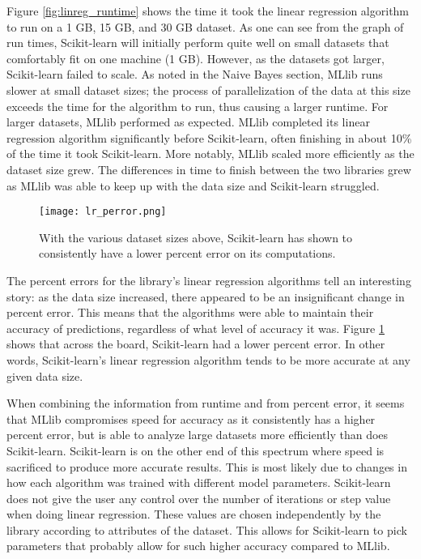 \documentclass[9pt,twocolumn,twoside]{idsi}
\begin{document}
Figure \ref{fig:linreg_runtime} shows the time it took the linear regression algorithm to run on a 1 GB, 15 GB, and 30 GB dataset. As one can see from the graph of run times, Scikit-learn will initially perform quite well on small datasets that comfortably fit on one machine (1 GB). However, as the datasets got larger, Scikit-learn failed to scale. As noted in the Naive Bayes section, MLlib runs slower at small dataset sizes; the process of parallelization of the data at this size exceeds the time for the algorithm to run, thus causing a larger runtime. For larger datasets, MLlib performed as expected. MLlib completed its linear regression algorithm significantly before Scikit-learn, often finishing in about 10\% of the time it took Scikit-learn. More notably, MLlib scaled more efficiently as the dataset size grew. The differences in time to finish between the two libraries grew as MLlib was able to keep up with the data size and Scikit-learn struggled. 


\begin{figure}[htbp]
\centering
\texttt{[image: lr\_perror.png]}
\caption{With the various dataset sizes above, Scikit-learn has shown to consistently have a lower percent error on its computations.}
\label{fig:linreg_mse}
\end{figure}

The percent errors for the library's linear regression algorithms tell an interesting story: as the data size increased, there appeared to be an insignificant change in percent error. This means that the algorithms were able to maintain their accuracy of predictions, regardless of what level of accuracy it was. Figure \ref{fig:linreg_mse} shows that across the board, Scikit-learn had a lower percent error.  In other words, Scikit-learn's linear regression algorithm tends to be more accurate at any given data size.

When combining the information from runtime and from percent error, it seems that MLlib compromises speed for accuracy as it consistently has a higher percent error, but is able to analyze large datasets more efficiently than does Scikit-learn. Scikit-learn is on the other end of this spectrum where speed is sacrificed to produce more accurate results. This is most likely due to changes in how each algorithm was trained with different model parameters. Scikit-learn does not give the user any control over the number of iterations or step value when doing linear regression. These values are chosen independently by the library according to attributes of the dataset. This allows for Scikit-learn to pick parameters that probably allow for such higher accuracy compared to MLlib. 
\end{document}
